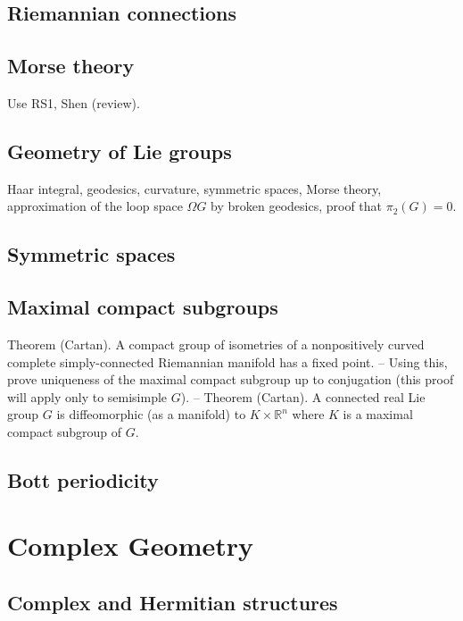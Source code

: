 \subsection{Riemannian connections}



\subsection{Morse theory}

Use RS1, Shen (review). 


\subsection{Geometry of Lie groups}
Haar integral, geodesics, curvature, symmetric spaces, Morse theory, approximation of the loop space $\Omega G$ by broken geodesics, proof that $\pi_2(G)=0$.


\subsection{Symmetric spaces}


\subsection{Maximal compact subgroups}

Theorem (Cartan). A compact group of isometries of a nonpositively curved complete simply-connected Riemannian manifold has a fixed point.
--
Using this, prove uniqueness of the maximal compact subgroup up to conjugation (this proof will apply only to semisimple $G$).
--
Theorem (Cartan). A connected real Lie group $G$ is diffeomorphic (as a manifold) to $K\times\mathbb{R}^n$ where $K$ is a maximal compact subgroup of $G$.






\subsection{Bott periodicity}




\newpage
\section{Complex Geometry}


\subsection{Complex and Hermitian structures}

